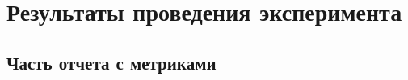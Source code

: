 \chapter{Результаты проведения эксперимента}\label{app:results}

\section{Часть отчета с метриками}\label{app:results1}

\begingroup
\captiondelim{ } %

\endgroup